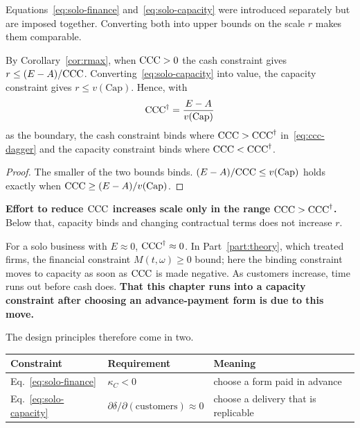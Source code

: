 Equations~\eqref{eq:solo-finance} and~\eqref{eq:solo-capacity} were introduced separately but
are imposed together. Converting both into upper bounds on the scale $r$ makes them
comparable.

\begin{proposition}
\label{prop:binding-switch}
By Corollary~\ref{cor:rmax}, when $\mathrm{CCC}>0$ the cash constraint gives $r\leq(E-A)/\mathrm{CCC}$.
Converting~\eqref{eq:solo-capacity} into value, the capacity constraint gives
$r\leq v(\mathrm{Cap})$. Hence, with
\begin{equation}
\mathrm{CCC}^{\dagger} = \frac{E-A}{v(\mathrm{Cap})}
\label{eq:ccc-dagger}
\end{equation}
as the boundary, the cash constraint binds where $\mathrm{CCC}>\mathrm{CCC}^{\dagger}$ in~\eqref{eq:ccc-dagger}
and the capacity constraint binds where $\mathrm{CCC}<\mathrm{CCC}^{\dagger}$.
\end{proposition}

\begin{proof}
The smaller of the two bounds binds. $(E-A)/\mathrm{CCC} \leq v(\mathrm{Cap})$ holds exactly when
$\mathrm{CCC}\geq(E-A)/v(\mathrm{Cap})$.
\end{proof}

\textbf{Effort to reduce $\mathrm{CCC}$ increases scale only in the range $\mathrm{CCC}>\mathrm{CCC}^{\dagger}$.}
Below that, capacity binds and changing contractual terms does not increase $r$.

For a solo business with $E\approx 0$, $\mathrm{CCC}^{\dagger}\approx 0$. In Part~\ref{part:theory},
which treated firms, the financial constraint $M(t,\omega)\geq 0$ bound; here the binding
constraint moves to capacity as soon as $\mathrm{CCC}$ is made negative. As customers increase, time
runs out before cash does.
\textbf{That this chapter runs into a capacity constraint after choosing an advance-payment
form is due to this move.}

The design principles therefore come in two.

\begin{center}
\begin{tabularx}{\textwidth}{@{}llX@{}}
\toprule
Constraint & Requirement & Meaning \\
\midrule
Eq.~\eqref{eq:solo-finance} & $\kappa_C < 0$ & choose a form paid in advance \\
Eq.~\eqref{eq:solo-capacity} & $\partial\delta/\partial(\text{customers})\approx 0$ & choose a delivery that is replicable \\
\bottomrule
\end{tabularx}
\label{tab:solo-constraint-design}
\end{center}

